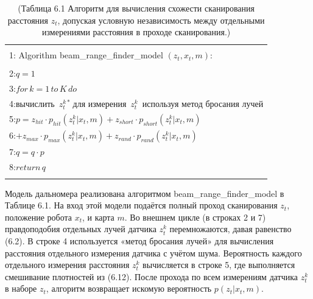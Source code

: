 \documentclass[10pt,a4paper]{article}
\begin{document}
\begin{table}[H]
\begin{center}
\begin{tabular}{|l|}
\hline
{}\\
1: \hspace{3mm} Algorithm beam\_range\_finder\_model $(z_t,x_t,m):$ \\
{}\\
2:\hspace{7mm}$q=1$\\
3:\hspace{7mm}$\textit{for}\,k=1\,\textit{to}\,K\,\textit{do}$\\
4:\hspace{12mm}$\textit{вычислить }\,z_t^{k*}\,\textit{для измерения }\,z_t^k\,\textit{ используя метод бросания лучей}$\\
5:\hspace{12mm}$p=z_{hit}\cdot p_{hit}(z_t^k|x_t,m)+z_{short}\cdot p_{short} (z_t^k|x_t,m)$\\
6:\hspace{17mm}$+z_{max}\cdot p_{max}(z_t^k|x_t,m)+z_{rand}\cdot p_{rand} (z_t^k|x_t,m)$\\
7:\hspace{12mm}$q=q\cdot p$\\
8:\hspace{7mm}$\textit{return}\,q$\\
{}\\
\hline
\end{tabular}
\caption{(Таблица 6.1 Алгоритм для вычисления схожести сканирования расстояния $z_t$, допуская условную независимость между отдельными измерениями расстояния в проходе сканирования.)}
\end{center}
\end{table}

Модель дальномера реализована алгоритмом  beam\_range\_finder\_model в Таблице 6.1. На вход этой модели подаётся  полный проход сканирования $z_t$, положение робота $x_t$, и карта $m$. Во внешнем цикле (в строках 2 и 7) правдоподобия отдельных лучей датчика $z_t^k$ перемножаются, давая равенство (6.2). В строке 4 используется «метод бросания лучей» для вычисления расстояния отдельного измерения датчика с учётом шума. Вероятность каждого отдельного измерения расстояния $z^k_t$ вычисляется в строке 5, где выполняется смешивание плотностей из (6.12). После прохода по всем измерениям датчика $z_t^k$ в наборе $z_t$, алгоритм возвращает искомую вероятность $p(z_t | x_t, m)$.\\
\end{document}
